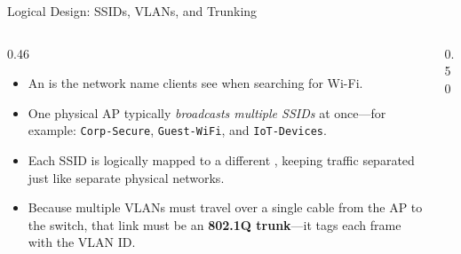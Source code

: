 \documentclass[aspectratio=169]{beamer}
\begin{document}
\begin{frame}{Logical Design: SSIDs, VLANs, and Trunking}
    \begin{columns}[T]
        \begin{column}{0.46\textwidth}
            \footnotesize
            \begin{itemize}
                \item An  is the network name clients see when searching for Wi-Fi.
                \item One physical AP typically \emph{broadcasts multiple SSIDs} at once---for example: \texttt{Corp-Secure}, \texttt{Guest-WiFi}, and \texttt{IoT-Devices}.
                \item Each SSID is logically mapped to a different , keeping traffic separated just like separate physical networks.
                \item Because multiple VLANs must travel over a single cable from the AP to the switch, that link must be an \textbf{802.1Q trunk}---it tags each frame with the VLAN ID.
            \end{itemize}
        \end{column}
        \begin{column}{0.50\textwidth}
            \begin{center}
\end{center}
\end{column}
\end{columns}
\end{frame}
\end{document}
